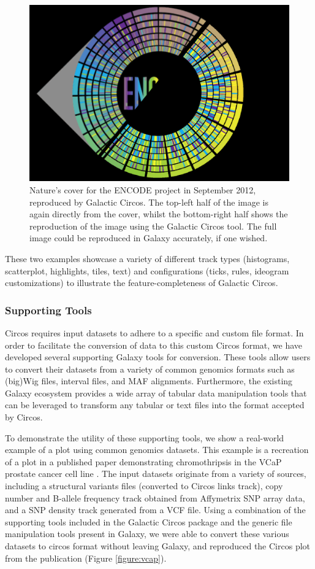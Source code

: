 \begin{figure}[h!]
\centering
\includegraphics[width=0.7\linewidth]{chapters/images/circos/plot-encode-both.png}
\caption{Nature's cover for the ENCODE project in September 2012, reproduced by Galactic Circos. The top-left half of the image is again directly from the cover, whilst the bottom-right half shows the reproduction of the image using the Galactic Circos tool. The full image could be reproduced in Galaxy accurately, if one wished.}
\label{figure:encode}
\end{figure}

These two examples showcase a variety of different track types (histograms, scatterplot, highlights, tiles, text) and configurations (ticks, rules, ideogram customizations) to illustrate the feature-completeness of Galactic Circos. %

\subsubsection{Supporting Tools}
Circos requires input datasets to adhere to a specific and custom file format. In order to facilitate the conversion of data to this custom Circos format, we have developed several supporting Galaxy tools for conversion. These tools allow users to convert their datasets from a variety of common genomics formats such as (big)Wig files, interval files, and MAF alignments. Furthermore, the existing Galaxy ecosystem provides a wide array of tabular data manipulation tools that can be leveraged to transform any tabular or text files into the format accepted by Circos.

To demonstrate the utility of these supporting tools, we show a real-world example of a plot using common genomics datasets. This example is a recreation of a plot in a published paper demonstrating chromothripsis in the VCaP prostate cancer cell line \cite{alves2013gene}. The input datasets originate from a variety of sources, including a structural variants files (converted to Circos links track), copy number and B-allele frequency track obtained from Affymetrix SNP array data, and a SNP density track generated from a VCF file. Using a combination of the supporting tools included in the Galactic Circos package and the generic file manipulation tools present in Galaxy, we were able to convert these various datasets to circos format without leaving Galaxy, and reproduced the Circos plot from the publication (Figure \ref{figure:vcap}).


